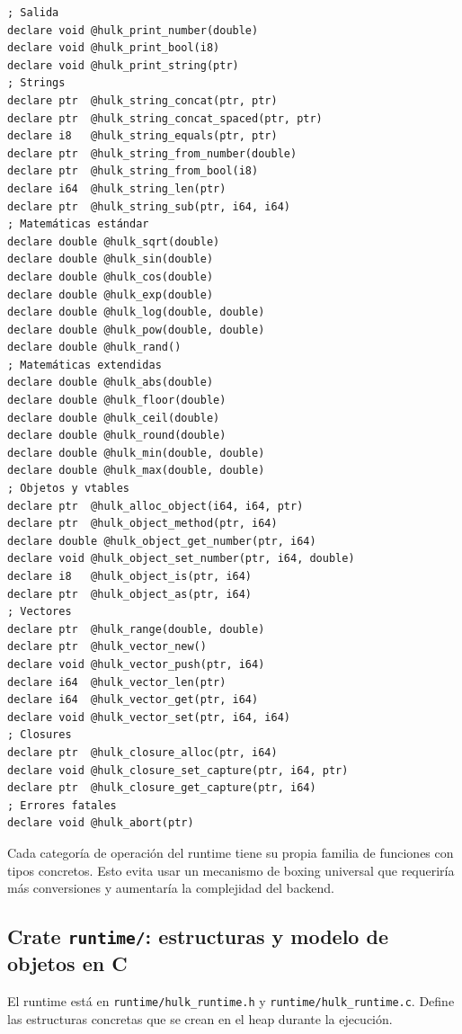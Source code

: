 \documentclass[12pt,letterpaper]{article}
\newcommand{\src}[1]{\texttt{#1}}
\begin{document}
\begin{lstlisting}[caption={Declaraciones de ABI con el runtime (completas)}]
; Salida
declare void @hulk_print_number(double)
declare void @hulk_print_bool(i8)
declare void @hulk_print_string(ptr)
; Strings
declare ptr  @hulk_string_concat(ptr, ptr)
declare ptr  @hulk_string_concat_spaced(ptr, ptr)
declare i8   @hulk_string_equals(ptr, ptr)
declare ptr  @hulk_string_from_number(double)
declare ptr  @hulk_string_from_bool(i8)
declare i64  @hulk_string_len(ptr)
declare ptr  @hulk_string_sub(ptr, i64, i64)
; Matemáticas estándar
declare double @hulk_sqrt(double)
declare double @hulk_sin(double)
declare double @hulk_cos(double)
declare double @hulk_exp(double)
declare double @hulk_log(double, double)
declare double @hulk_pow(double, double)
declare double @hulk_rand()
; Matemáticas extendidas
declare double @hulk_abs(double)
declare double @hulk_floor(double)
declare double @hulk_ceil(double)
declare double @hulk_round(double)
declare double @hulk_min(double, double)
declare double @hulk_max(double, double)
; Objetos y vtables
declare ptr  @hulk_alloc_object(i64, i64, ptr)
declare ptr  @hulk_object_method(ptr, i64)
declare double @hulk_object_get_number(ptr, i64)
declare void @hulk_object_set_number(ptr, i64, double)
declare i8   @hulk_object_is(ptr, i64)
declare ptr  @hulk_object_as(ptr, i64)
; Vectores
declare ptr  @hulk_range(double, double)
declare ptr  @hulk_vector_new()
declare void @hulk_vector_push(ptr, i64)
declare i64  @hulk_vector_len(ptr)
declare i64  @hulk_vector_get(ptr, i64)
declare void @hulk_vector_set(ptr, i64, i64)
; Closures
declare ptr  @hulk_closure_alloc(ptr, i64)
declare void @hulk_closure_set_capture(ptr, i64, ptr)
declare ptr  @hulk_closure_get_capture(ptr, i64)
; Errores fatales
declare void @hulk_abort(ptr)
\end{lstlisting}

Cada categoría de operación del runtime tiene su propia familia de funciones con tipos concretos. Esto evita usar un mecanismo de boxing universal que requeriría más conversiones y aumentaría la complejidad del backend.

\subsection{Crate \src{runtime/}: estructuras y modelo de objetos en C}

El runtime está en \src{runtime/hulk\_runtime.h} y \src{runtime/hulk\_runtime.c}. Define las estructuras concretas que se crean en el heap durante la ejecución.
\end{document}

